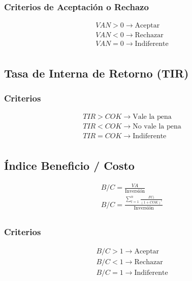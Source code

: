 \documentclass[a4paper, twocolumn]{article}
\begin{document}
\subsubsection{Criterios de Aceptación o Rechazo}

\begin{gather*}
    VAN > 0 \rightarrow \text{Aceptar} \\
    VAN < 0 \rightarrow \text{Rechazar} \\
    VAN = 0 \rightarrow \text{Indiferente} \\
\end{gather*}

\subsection{Tasa de Interna de Retorno (TIR)}

\subsubsection{Criterios}

\begin{gather*}
    TIR > COK \rightarrow \text{Vale la pena} \\
    TIR < COK \rightarrow \text{No vale la pena} \\
    TIR = COK \rightarrow \text{Indiferente} \\
\end{gather*}

\subsection{Índice Beneficio / Costo}

\begin{gather*}
    B / C = \frac{VA}{\text{Inversión}} \\
    B / C = \frac{\sum_{t = 1}^{n} \frac{FC_t}{(1 + COK)^t}}{\text{Inversión}} \\
\end{gather*}

\subsubsection{Criterios}

\begin{gather*}
    B / C > 1 \rightarrow \text{Aceptar} \\
    B / C < 1 \rightarrow \text{Rechazar} \\
    B / C = 1 \rightarrow \text{Indiferente} \\
\end{gather*}
\end{document}
